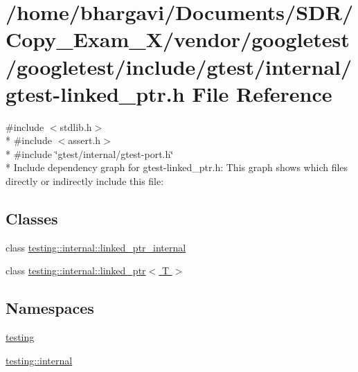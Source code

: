 \hypertarget{gtest-linked__ptr_8h}{}\section{/home/bhargavi/\+Documents/\+S\+D\+R/\+Copy\+\_\+\+Exam\+\_\+X/vendor/googletest/googletest/include/gtest/internal/gtest-\/linked\+\_\+ptr.h File Reference}
\label{gtest-linked__ptr_8h}
{\ttfamily \#include $<$stdlib.\+h$>$}\\*
{\ttfamily \#include $<$assert.\+h$>$}\\*
{\ttfamily \#include \char`\"{}gtest/internal/gtest-\/port.\+h\char`\"{}}\\*
Include dependency graph for gtest-\/linked\+\_\+ptr.h\+:
This graph shows which files directly or indirectly include this file\+:
\subsection*{Classes}
\begin{DoxyCompactItemize}
\item 
class \hyperlink{classtesting_1_1internal_1_1linked__ptr__internal}{testing\+::internal\+::linked\+\_\+ptr\+\_\+internal}
\item 
class \hyperlink{classtesting_1_1internal_1_1linked__ptr}{testing\+::internal\+::linked\+\_\+ptr$<$ T $>$}
\end{DoxyCompactItemize}
\subsection*{Namespaces}
\begin{DoxyCompactItemize}
\item 
 \hyperlink{namespacetesting}{testing}
\item 
 \hyperlink{namespacetesting_1_1internal}{testing\+::internal}
\end{DoxyCompactItemize}
